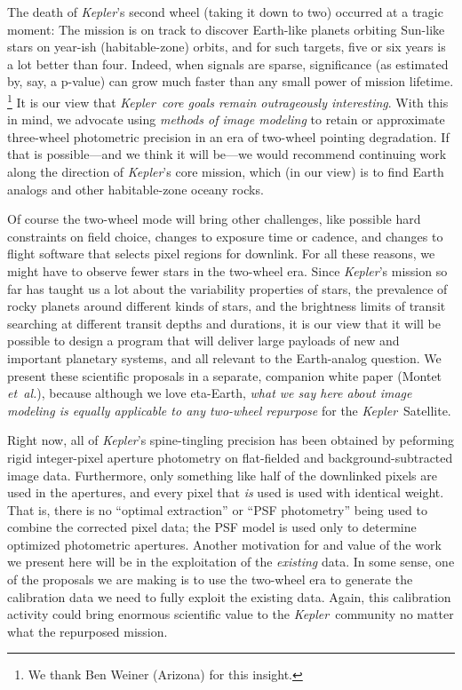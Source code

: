 \documentclass[letterpaper,12pt,whitepaper]{haastex}
\newcommand{\foreign}[1]{\textit{#1}}
\newcommand{\etal}{\foreign{et~al.}}
\newcommand{\observatory}[1]{\textsl{#1}}
\newcommand{\Kepler}{\observatory{Kepler}}
\begin{document}
The death of \Kepler's second wheel (taking it down to two)
  occurred at a tragic moment:
The mission is on track to discover Earth-like planets
  orbiting Sun-like stars on year-ish (habitable-zone) orbits,
  and for such targets, five or six years is a lot better than four.
Indeed, when signals are sparse, significance
  (as estimated by, say, a p-value)
  can grow much faster than any small power of mission lifetime.%
  \footnote{We thank Ben Weiner (Arizona) for this insight.}
It is our view that \emph{\Kepler\ core goals remain outrageously interesting}.
With this in mind, we advocate using \emph{methods of image modeling} to retain
  or approximate three-wheel photometric precision
  in an era of two-wheel pointing degradation.
If that is possible---and we think it will be---we would recommend continuing work
  along the direction of \Kepler's core mission,
  which (in our view) is to find Earth analogs and other habitable-zone oceany rocks.

Of course the two-wheel mode will bring other challenges, like
  possible hard constraints on field choice,
  changes to exposure time or cadence,
  and changes to flight software that selects pixel regions for downlink.
For all these reasons, we might have to observe fewer stars in the two-wheel era.
Since \Kepler's mission so far has taught us a lot about the variability
  properties of stars,
  the prevalence of rocky planets around different kinds of stars,
  and the brightness limits of transit searching at different transit depths and durations,
  it is our view that it will be possible to design a program that will deliver
  large payloads of new and important planetary systems,
  and all relevant to the Earth-analog question.
We present these scientific proposals in a separate, companion white paper (Montet \etal),
  because although we love eta-Earth,
  \emph{what we say here about image modeling is equally applicable
  to any two-wheel repurpose} for the \Kepler~Satellite.

Right now, all of \Kepler's spine-tingling precision
  has been obtained by peforming rigid integer-pixel aperture photometry
  on flat-fielded and background-subtracted image data.
Furthermore, only something like half of the downlinked pixels are used in the apertures,
  and every pixel that \emph{is} used is used with identical weight.
That is, there is no ``optimal extraction'' or ``PSF photometry'' being
  used to combine the corrected pixel data;
  the PSF model is used only to determine optimized photometric apertures.
Another motivation for and value of the work we present here will be
  in the exploitation of the \emph{existing} data.
In some sense, one of the proposals we are making is to use the two-wheel era
  to generate the calibration data we need to fully exploit the existing data.
Again, this calibration activity could bring enormous scientific value to the \Kepler\ community
  no matter what the repurposed mission.
\end{document}
